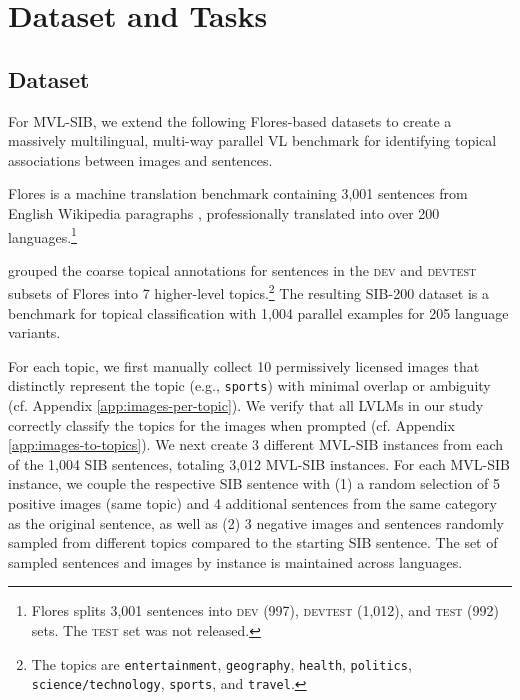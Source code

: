 \section{Dataset and Tasks}

\subsection{Dataset}
\label{sec:dataset}

For MVL-SIB, we extend the following Flores-based datasets to create a massively multilingual, multi-way parallel VL benchmark for identifying topical associations between images and sentences.

 Flores is a machine translation benchmark containing 3,001 sentences from English Wikipedia paragraphs \cite{nllbteam2022language}, professionally translated into over 200 languages.\footnote{Flores splits 3,001 sentences into \textsc{dev} (997), \textsc{devtest} (1,012), and \textsc{test} (992) sets. The \textsc{test} set was not released.}

 \citet{adelani-etal-2024-sib} grouped the coarse topical annotations for sentences in the \textsc{dev} and \textsc{devtest} subsets of Flores into 7 higher-level topics.\footnote{The topics are \texttt{entertainment}, \texttt{geography}, \texttt{health}, \texttt{politics}, \texttt{science/technology}, \texttt{sports}, and \texttt{travel}.} The resulting SIB-200 dataset is a benchmark for topical classification with 1,004 parallel examples for 205 language variants.

 For each topic, we first manually collect 10 permissively licensed images that distinctly represent the topic (e.g., \texttt{sports}) with minimal overlap or ambiguity (cf. Appendix \ref{app:images-per-topic}). We verify that all LVLMs in our study correctly classify the topics for the images when prompted (cf. Appendix \ref{app:images-to-topics}). We next create 3 different MVL-SIB instances from each of the 1,004 SIB sentences, totaling 3,012 MVL-SIB instances.
For each MVL-SIB instance, we couple the respective SIB sentence with (1) a random selection of 5 positive images (same topic) and 4 additional sentences from the same category as the original sentence, as well as (2) 3 negative images and sentences randomly sampled from different topics compared to the starting SIB sentence. The set of sampled sentences and images by instance is maintained across languages. 

